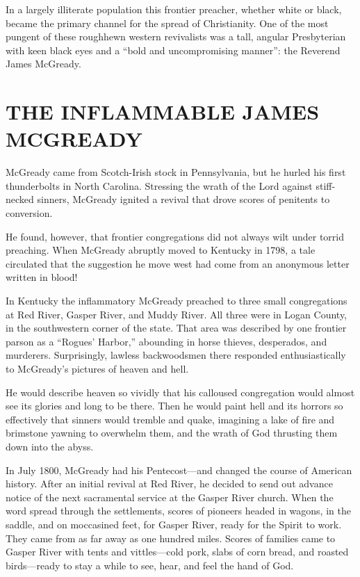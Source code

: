 In a largely illiterate population this frontier preacher, whether white or black, became the
primary channel for the spread of Christianity. One of the most pungent of these roughhewn western
revivalists was a tall, angular Presbyterian with keen black eyes and a “bold and uncompromising
manner”: the Reverend James McGready.

\section{THE INFLAMMABLE JAMES MCGREADY}

McGready came from Scotch-Irish stock in Pennsylvania, but he hurled his first thunderbolts in North
Carolina. Stressing the wrath of the Lord against stiff-necked sinners, McGready ignited a revival
that drove scores of penitents to conversion.

He found, however, that frontier congregations did not always wilt under torrid preaching. When
McGready abruptly moved to Kentucky in 1798, a tale circulated that the suggestion he move west had
come from an anonymous letter written in blood!

In Kentucky the inflammatory McGready preached to three small congregations at Red River, Gasper
River, and Muddy River. All three were in Logan County, in the southwestern corner of the state.
That area was described by one frontier parson as a “Rogues’ Harbor,” abounding in horse thieves,
desperados, and murderers. Surprisingly, lawless backwoodsmen there responded enthusiastically to
McGready’s pictures of heaven and hell.

He would describe heaven so vividly that his calloused congregation would almost see its glories and
long to be there. Then he would paint hell and its horrors so effectively that sinners would tremble
and quake, imagining a lake of fire and brimstone yawning to overwhelm them, and the wrath of God
thrusting them down into the abyss.

In July 1800, McGready had his Pentecost—and changed the course of American history. After an
initial revival at Red River, he decided to send out advance notice of the next sacramental service
at the Gasper River church. When the word spread through the settlements, scores of pioneers headed
in wagons, in the saddle, and on moccasined feet, for Gasper River, ready for the Spirit to work.
They came from as far away as one hundred miles. Scores of families came to Gasper River with tents
and vittles—cold pork, slabs of corn bread, and roasted birds—ready to stay a while to see, hear,
and feel the hand of God.

